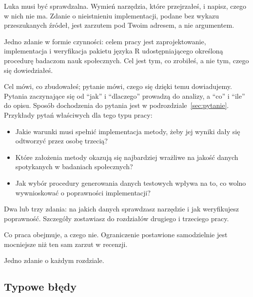 Luka musi być sprawdzalna. Wymień narzędzia, które przejrzałeś, i napisz, czego w nich nie ma. Zdanie o nieistnieniu implementacji, podane bez wykazu przeszukanych źródeł, jest zarzutem pod Twoim adresem, a nie argumentem.

 Jedno zdanie w formie czynności: celem pracy jest zaprojektowanie, implementacja i weryfikacja pakietu języka R udostępniającego określoną procedurę badaczom nauk społecznych. Cel jest tym, co zrobiłeś, a nie tym, czego się dowiedziałeś.

 Cel mówi, co zbudowałeś; pytanie mówi, czego się dzięki temu dowiadujemy. Pytania zaczynające się od \enquote{jak} i \enquote{dlaczego} prowadzą do analizy, a \enquote{co} i \enquote{ile} do opisu. Sposób dochodzenia do pytania jest w podrozdziale~\ref{sec:pytanie}. Przykłady pytań właściwych dla tego typu pracy:

\begin{itemize}
\item Jakie warunki musi spełnić implementacja metody, żeby jej wyniki dały się odtworzyć przez osobę trzecią?
\item Które założenia metody okazują się najbardziej wrażliwe na jakość danych spotykanych w badaniach społecznych?
\item Jak wybór procedury generowania danych testowych wpływa na to, co wolno wywnioskować o poprawności implementacji?
\end{itemize}

 Dwa lub trzy zdania: na jakich danych sprawdzasz narzędzie i jak weryfikujesz poprawność. Szczegóły zostawiasz do rozdziałów drugiego i trzeciego pracy.

 Co praca obejmuje, a czego nie. Ograniczenie postawione samodzielnie jest mocniejsze niż ten sam zarzut w recenzji.

 Jedno zdanie o każdym rozdziale.

\subsection{Typowe błędy}

